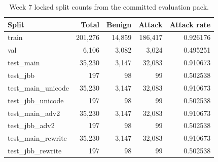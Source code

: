 \begin{table}[t]
\centering
\caption{Week 7 locked split counts from the committed evaluation pack.}
\label{tab:week7_split_counts}
\begin{tabular}{lrrrr}
\toprule
Split & Total & Benign & Attack & Attack rate \\
\midrule
train & 201,276 & 14,859 & 186,417 & 0.926176 \\
val & 6,106 & 3,082 & 3,024 & 0.495251 \\
test\_main & 35,230 & 3,147 & 32,083 & 0.910673 \\
test\_jbb & 197 & 98 & 99 & 0.502538 \\
test\_main\_unicode & 35,230 & 3,147 & 32,083 & 0.910673 \\
test\_jbb\_unicode & 197 & 98 & 99 & 0.502538 \\
test\_main\_adv2 & 35,230 & 3,147 & 32,083 & 0.910673 \\
test\_jbb\_adv2 & 197 & 98 & 99 & 0.502538 \\
test\_main\_rewrite & 35,230 & 3,147 & 32,083 & 0.910673 \\
test\_jbb\_rewrite & 197 & 98 & 99 & 0.502538 \\
\bottomrule
\end{tabular}
\end{table}
